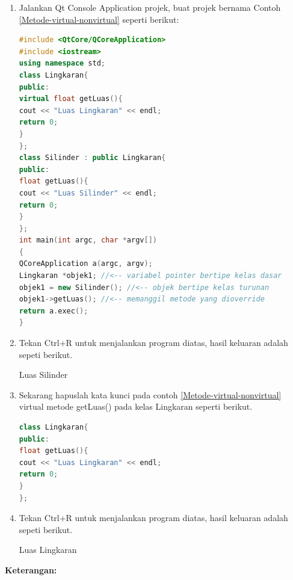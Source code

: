 \begin{enumerate}
\def\labelenumi{\arabic{enumi}.}
\item
  Jalankan Qt Console Application projek, buat projek bernama Contoh \ref{Metode-virtual-nonvirtual}
  seperti berikut:

\begin{lstlisting}[language=c++, caption=Metode virtual dan non virtual, label=Metode-virtual-nonvirtual]
#include <QtCore/QCoreApplication>
#include <iostream>
using namespace std;
class Lingkaran{
public:
virtual float getLuas(){
cout << "Luas Lingkaran" << endl;
return 0;
}
};
class Silinder : public Lingkaran{
public:
float getLuas(){
cout << "Luas Silinder" << endl;
return 0;
}
};
int main(int argc, char *argv[])
{
QCoreApplication a(argc, argv);
Lingkaran *objek1; //<-- variabel pointer bertipe kelas dasar
objek1 = new Silinder(); //<-- objek bertipe kelas turunan
objek1->getLuas(); //<-- memanggil metode yang dioverride
return a.exec();
}
\end{lstlisting}
\item
  Tekan Ctrl+R untuk menjalankan program diatas, hasil keluaran adalah
  sepeti berikut.

\begin{lcverbatim}
Luas Silinder
\end{lcverbatim} 
\item
  Sekarang hapuslah kata kunci pada contoh \ref{Metode-virtual-nonvirtual} virtual metode getLuas() pada kelas
  Lingkaran seperti berikut.

\begin{lstlisting}[language=c++, caption=Menghapus methode getluas]
class Lingkaran{
public:
float getLuas(){
cout << "Luas Lingkaran" << endl;
return 0;
}
};
\end{lstlisting}
\item
  Tekan Ctrl+R untuk menjalankan program diatas, hasil keluaran adalah
  sepeti berikut.


\begin{lcverbatim}
Luas Lingkaran
\end{lcverbatim} 
\end{enumerate}
\textbf{Keterangan:}

